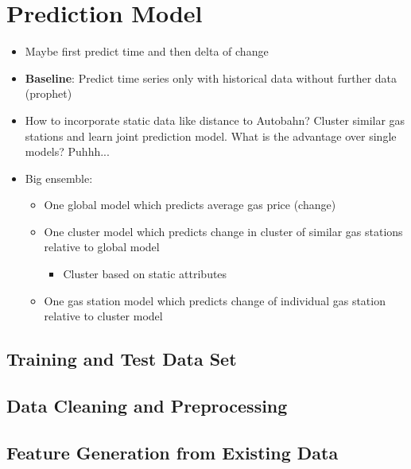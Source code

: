 \documentclass[%
a4paper,
DIV12,
2.5headlines,
bigheadings,
titlepage,
openbib,
]{scrartcl}
\begin{document}
\section{Prediction Model}\label{prediction-model}
\begin{itemize}
\item Maybe first predict time and then delta of change\\
\item \textbf{Baseline}: Predict time series only with historical data without further data (prophet)\\
\item How to incorporate static data like distance to Autobahn? Cluster similar gas stations and learn joint prediction model. 
What is the advantage over single models? Puhhh...\\
\item Big ensemble:

\begin{itemize}
\item One global model which predicts average gas price (change)
\item One cluster model which predicts change in cluster of similar gas stations relative to global model

\begin{itemize}
\item Cluster based on static attributes
\end{itemize}

\item One gas station model which predicts change of individual gas station relative to cluster model
\end{itemize}
\end{itemize}



\subsection{Training and Test Data
Set}\label{training-and-test-data-set}


\subsection{Data Cleaning and
Preprocessing}\label{data-cleaning-and-preprocessing}


\subsection{Feature Generation from Existing
Data}\label{feature-generation-from-existing-data}
\end{document}
